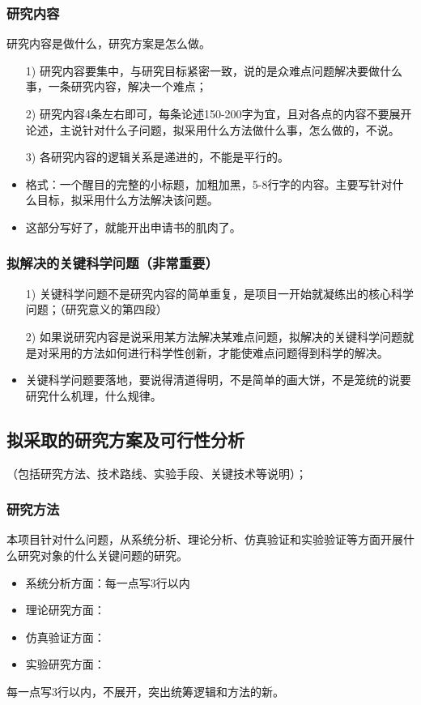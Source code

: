 \subsubsection{研究内容}
研究内容是做什么，研究方案是怎么做。
\begin{itemize}
\item[1)] 研究内容要集中，与研究目标紧密一致，说的是众难点问题解决要做什么事，一条研究内容，解决一个难点；

\item[2)] 研究内容4条左右即可，每条论述150-200字为宜，且对各点的内容不要展开论述，主说针对什么子问题，拟采用什么方法做什么事，怎么做的，不说。

\item[3)] 各研究内容的逻辑关系是递进的，不能是平行的。

\item 格式：一个醒目的完整的小标题，加粗加黑，5-8行字的内容。主要写针对什么目标，拟采用什么方法解决该问题。

\item {\color{red} 这部分写好了，就能开出申请书的肌肉了。}
\end{itemize}


\subsubsection{拟解决的关键科学问题（非常重要）}
\begin{itemize}
\item[1)]  关键科学问题不是研究内容的简单重复，是项目一开始就凝练出的核心科学问题；（研究意义的第四段）

\item[2)] 如果说研究内容是说采用某方法解决某难点问题，拟解决的关键科学问题就是对采用的方法如何进行科学性创新，才能使难点问题得到科学的解决。

\item 关键科学问题要落地，要说得清道得明，不是简单的画大饼，不是笼统的说要研究什么机理，什么规律。
\end{itemize}





\subsection{拟采取的研究方案及可行性分析}
（包括研究方法、技术路线、实验手段、关键技术等说明）；
\subsubsection{研究方法}
本项目针对什么问题，从系统分析、理论分析、仿真验证和实验验证等方面开展什么研究对象的什么关键问题的研究。
\begin{itemize}
\item 系统分析方面：每一点写3行以内
\item 理论研究方面：
\item 仿真验证方面：
\item 实验研究方面：
\end{itemize}
每一点写3行以内，不展开，突出统筹逻辑和方法的新。


